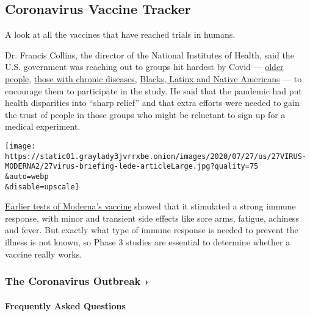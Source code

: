 \hypertarget{coronavirus-vaccine-tracker}{%
\subsection{Coronavirus Vaccine
Tracker}\label{coronavirus-vaccine-tracker}}

A look at all the vaccines that have reached trials in humans.

Dr. Francis Collins, the director of the National Institutes of Health,
said the U.S. government was reaching out to groups hit hardest by Covid
---
\href{https://www.nytimes3xbfgragh.onion/2020/03/14/health/coronavirus-elderly-protection.html}{older
people},
\href{https://www.nytimes3xbfgragh.onion/2020/03/12/health/coronavirus-midlife-conditions.html}{those
with chronic diseases},
\href{https://www.nytimes3xbfgragh.onion/interactive/2020/07/05/us/coronavirus-latinos-african-americans-cdc-data.html}{Blacks,
Latinx and Native Americans} --- to encourage them to participate in the
study. He said that the pandemic had put health disparities into ``sharp
relief'' and that extra efforts were needed to gain the trust of people
in those groups who might be reluctant to sign up for a medical
experiment.

\texttt{[image: https://static01.graylady3jvrrxbe.onion/images/2020/07/27/us/27VIRUS-MODERNA2/27virus-briefing-lede-articleLarge.jpg?quality=75\\\&auto=webp\\\&disable=upscale]}

\href{https://www.nytimes3xbfgragh.onion/2020/07/14/health/cornavirus-vaccine-moderna.html?searchResultPosition=5}{Earlier
tests of Moderna's vaccine} showed that it stimulated a strong immune
response, with minor and transient side effects like sore arms, fatigue,
achiness and fever. But exactly what type of immune response is needed
to prevent the illness is not known, so Phase 3 studies are essential to
determine whether a vaccine really works.

\href{https://www.nytimes3xbfgragh.onion/news-event/coronavirus?action=click\&pgtype=Article\&state=default\&region=MAIN_CONTENT_3\&context=storylines_faq}{}

\hypertarget{the-coronavirus-outbreak-}{%
\subsubsection{The Coronavirus Outbreak
›}\label{the-coronavirus-outbreak-}}

\hypertarget{frequently-asked-questions}{%
\paragraph{Frequently Asked
Questions}\label{frequently-asked-questions}}

